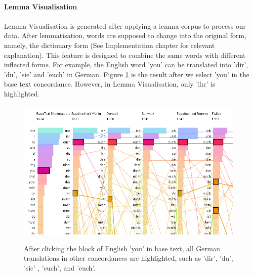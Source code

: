 \paragraph{Lemma Visualisation}
\paragraph[]{}Lemma Visualisation is generated after applying a lemma corpus to process our data. After lemmatisation, words are supposed to change into the original form, namely, the dictionary form (See Implementation chapter for relevant explanation). This feature is designed to combine the same words with different inflected forms. For example, the English word 'you' can be translated into 'dir', 'du', 'sie' and 'euch' in German. Figure \ref{fig:youInFreq} is the result after we select 'you' in the base text concordance. However, in Lemma Visualisation, only 'ihr' is highlighted.
 
\begin{figure}[H]
	\centering	
	\includegraphics[scale=0.5]{Figs/You-In-Frequency}\\[1ex]
	\caption{ After clicking the block of English 'you' in base text, all German translations in other concordances are highlighted, such as  'dir', 'du', 'sie' , 'euch', and 'euch'.} 
	\label{fig:youInFreq}
\end{figure} 


